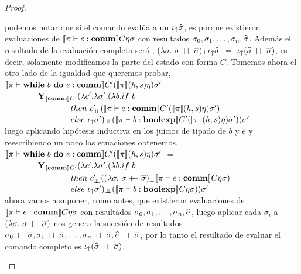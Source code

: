 \begin{proof}
\begin{itemize}
\begin{itemize}
podemos notar que si el comando eval\'ua a un $\iota_{\uparrow}\widehat{\sigma}$, es porque 
existieron evaluaciones de $\llbracket \pi \vdash e : \textbf{comm} \rrbracket C \eta \sigma$
con resultados $\sigma_0, \sigma_1, \ldots, \sigma_n, \widehat{\sigma}$. Adem\'as 
el resultado de la evaluaci\'on completa ser\'a ,
$(\lambda \sigma. \ \sigma +\kern-1.3ex+\kern0.8ex \overline{\sigma})_{\bot} \iota_{\uparrow} \widehat{\sigma}$ $=$
$\iota_{\uparrow} (\widehat{\sigma} +\kern-1.3ex+\kern0.8ex \overline{\sigma})$, es decir, solamente modificamos la parte del estado
con forma $C$. Tomemos ahora el otro lado de la igualdad que queremos probar,\\

$\llbracket \pi \vdash \textbf{while} \ b \ \textbf{do} \ e : \textbf{comm} \rrbracket C' (\llbracket \pi \rrbracket(h,s)\eta) \sigma'$ $=$ \\
\indent \ \ \ \ \ \ \ \
$\textbf{Y}_{\llbracket \textbf{comm} \rrbracket C'} (\lambda c' . \lambda \sigma' . (\lambda b . if \ b$ \\
\indent \ \ \ \ \ \ \ \ \ \ \ \ \ \ \ \
$then \ c'_{\dbot}(\semBrcks{\pi \vdash e : \commt}C'(\semBrcks{\pi}(h,s)\eta) \sigma')$ \\
\indent \ \ \ \ \ \ \ \ \ \ \ \ \ \ \ \
$else \ \iota_{\uparrow} \sigma')_{\bot \!\!\! \bot} 
	(\llbracket \pi \vdash b : \textbf{boolexp} \rrbracket C'(\llbracket \pi \rrbracket(h,s)\eta)\sigma'))\sigma'$ \\

luego aplicando hip\'otesis inductiva en los juicios de tipado de $b$ y $e$ y reescribiendo
un poco las ecuaciones obtenemos,\\

$\llbracket \pi \vdash \textbf{while} \ b \ \textbf{do} \ e : \textbf{comm} \rrbracket C' (\llbracket \pi \rrbracket(h,s)\eta) \sigma'$ $=$ \\
\indent \ \ \ \ \ \ \ \
$\textbf{Y}_{\llbracket \textbf{comm} \rrbracket C'} (\lambda c' . \lambda \sigma' . (\lambda b . if \ b$ \\
\indent \ \ \ \ \ \ \ \ \ \ \ \ \ \ \ \
$then \ c'_{\bot \!\!\! \bot}((\lambda \sigma. \ \sigma +\kern-1.3ex+\kern0.8ex \overline{\sigma})_{\bot}
					\llbracket \pi \vdash e : \textbf{comm} \rrbracket C \eta \sigma)$ \\
\indent \ \ \ \ \ \ \ \ \ \ \ \ \ \ \ \
$else \ \iota_{\uparrow} \sigma')_{\bot \!\!\! \bot} 
	(\llbracket \pi \vdash b : \textbf{boolexp} \rrbracket C \eta \sigma))\sigma'$ \\
	
ahora vamos a suponer, como antes, que existieron evaluaciones de 
$\llbracket \pi \vdash e : \textbf{comm} \rrbracket C \eta \sigma$
con resultados $\sigma_0, \sigma_1, \ldots, \sigma_n, \widehat{\sigma}$, luego
aplicar cada $\sigma_i$ a $(\lambda \sigma . \ \sigma +\kern-1.3ex+\kern0.8ex \overline{\sigma})$ nos
genera la sucesi\'on de resultados 
$\sigma_0\concat\sigmaover, \sigma_1\concat\sigmaover, \ldots, 
\sigma_n\concat\sigmaover, \sigmahat\concat\sigmaover$, por lo tanto el resultado
de evaluar el comando completo es $\iota_{\uparrow} (\widehat{\sigma}+\kern-1.3ex+\kern0.8ex\overline{\sigma})$.


\end{itemize}
\end{itemize}
\end{proof}
